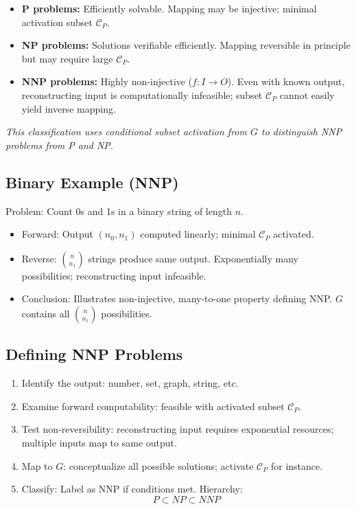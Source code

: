 \documentclass[12pt]{article}
\begin{document}
\begin{itemize}
    \item \textbf{P problems:} Efficiently solvable. Mapping may be injective; minimal activation subset $\mathcal{C}_P$.
    \item \textbf{NP problems:} Solutions verifiable efficiently. Mapping reversible in principle but may require large $\mathcal{C}_P$.
    \item \textbf{NNP problems:} Highly non-injective ($f: I \to O$). Even with known output, reconstructing input is computationally infeasible; subset $\mathcal{C}_P$ cannot easily yield inverse mapping.
\end{itemize}

\textit{This classification uses conditional subset activation from $G$ to distinguish NNP problems from P and NP.}

\subsection{Binary Example (NNP)}

Problem: Count 0s and 1s in a binary string of length $n$.

\begin{itemize}
    \item Forward: Output $(n_0, n_1)$ computed linearly; minimal $\mathcal{C}_P$ activated.
    \item Reverse: $\binom{n}{n_1}$ strings produce same output. Exponentially many possibilities; reconstructing input infeasible.
    \item Conclusion: Illustrates non-injective, many-to-one property defining NNP. $G$ contains all $\binom{n}{n_1}$ possibilities.
\end{itemize}

\subsection{Defining NNP Problems}

\begin{enumerate}
    \item Identify the output: number, set, graph, string, etc.
    \item Examine forward computability: feasible with activated subset $\mathcal{C}_P$.
    \item Test non-reversibility: reconstructing input requires exponential resources; multiple inputs map to same output.
    \item Map to $G$: conceptualize all possible solutions; activate $\mathcal{C}_P$ for instance.
    \item Classify: Label as NNP if conditions met. Hierarchy:
    \[
    P \subset NP \subset NNP
    \]
\end{enumerate}
\end{document}

